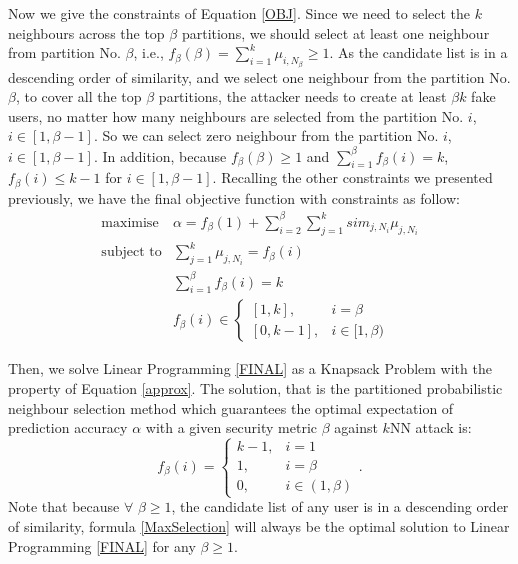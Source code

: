 \documentclass[11pt]{article}
\begin{document}
Now we give the constraints of Equation \eqref{OBJ}. Since we need to select the $k$ neighbours across the top $\beta$ partitions, we should select at least one neighbour from partition No. $\beta$, i.e., $f_{\beta}(\beta) = \sum_{i=1}^k{\mu_{i,N_\beta}} \geq 1$. As the candidate list is in a descending order of similarity, and we select one neighbour from the partition No. $\beta$, to cover all the top $\beta$ partitions, the attacker needs to create at least $\beta k$ fake users, no matter how many neighbours are selected from the partition No. $i$, $i \in [1,\beta-1]$. So we can select zero neighbour from the partition No. $i$, $i \in [1,\beta-1]$. In addition, because $f_{\beta}(\beta) \geq 1$ and $\sum_{i=1}^{\beta}f_{\beta}(i)=k$, $f_{\beta}(i) \leq k-1$ for $i \in [1, \beta-1]$. Recalling the other constraints we presented previously, we have the final objective function with constraints as follow:
\begin{equation}
\label{FINAL}
\begin{array}{ll}
\text{maximise} & \alpha = f_{\beta}(1) + \sum_{i=2}^{\beta}{\sum_{j=1}^{k}{sim_{j,N_i}\mu_{j,N_i}}}\\
\text{subject to} & \sum_{j=1}^{k}\mu_{j,N_i}=f_{\beta}(i)\\
 & \sum_{i=1}^{\beta}f_{\beta}(i)=k\\
 & f_{\beta}(i)\in\left\{ \begin{array}{ll}
[1,k], & i=\beta\\{}
[0,k-1], & i \in [1,\beta)
\end{array}\right.
\end{array}
\end{equation}

Then, we solve Linear Programming \eqref{FINAL} as a Knapsack Problem with the property of Equation \eqref{approx}. The solution, that is the partitioned probabilistic neighbour selection method which guarantees the optimal expectation of prediction accuracy $\alpha$ with a given security metric $\beta$ against $k$NN attack is:
\begin{equation}
\label{MaxSelection}
f_{\beta}(i)=\left\{ \begin{array}{cl}
k-1, & i=1\\
1, & i=\beta\\
0, & i \in (1,\beta)
\end{array}\right..
\end{equation}
Note that because $\forall$ $\beta \geq 1$, the candidate list of any user is in a descending order of similarity, formula \eqref{MaxSelection} will always be the optimal solution to Linear Programming \eqref{FINAL} for any $\beta \geq 1$.
\end{document}
